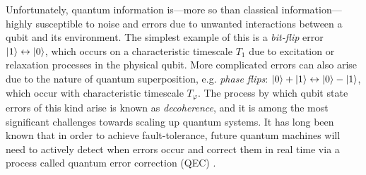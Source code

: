 Unfortunately, quantum information is---more so than classical information---highly susceptible to noise and errors due to unwanted interactions between a qubit and its environment. The simplest example of this is a \textit{bit-flip} error $\lvert1\rangle \leftrightarrow \lvert0\rangle$, which occurs on a characteristic timescale $T_1$ due to excitation or relaxation processes in the physical qubit. More complicated errors can also arise due to the nature of quantum superposition, e.g. \textit{phase flips}: $\lvert0\rangle + \lvert1\rangle \leftrightarrow \lvert0\rangle - \lvert1\rangle$, which occur with characteristic timescale $T_\varphi$. The process by which qubit state errors of this kind arise is known as \textit{decoherence}, and it is among the most significant challenges towards scaling up quantum systems. It has long been known that in order to achieve fault-tolerance, future quantum machines will need to actively detect when errors occur and correct them in real time via a process called quantum error correction (QEC) \cite{shor1996fault}.

